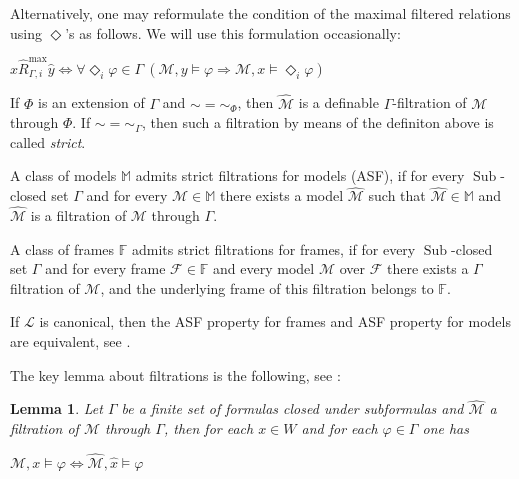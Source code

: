 \documentclass[a4paper]{article}
\theoremstyle{defin}
\theoremstyle{theorem}
\theoremstyle{prop}
\theoremstyle{lemma}
\newtheorem{lemma}{Lemma}
\theoremstyle{fact}
\theoremstyle{ex}
\theoremstyle{col}
\theoremstyle{claim}
\begin{document}
Alternatively, one may reformulate the condition of the maximal filtered relations using $\Diamond$'s as follows. We will use this formulation occasionally:

\begin{center}
  $\hat{x} \widehat{R}_{\Gamma,i}^{\text{max}} \hat{y} \Leftrightarrow \forall \Diamond_i \varphi \in \Gamma \: (\mathcal{M}, y \models \varphi \Rightarrow \mathcal{M}, x \models \Diamond_i \varphi)$
\end{center}

If $\Phi$ is an extension of $\Gamma$ and $\sim = \sim_{\Phi}$, then $\widehat{\mathcal{M}}$ is a definable $\Gamma$-filtration of $\mathcal{M}$ through $\Phi$. If $\sim = \sim_{\Gamma}$, then such a filtration by means of the definiton above is called \emph{strict}.

A class of models $\mathbb{M}$ admits strict filtrations for models (ASF), if for every $\operatorname{Sub}$-closed set $\Gamma$ and for every $\mathcal{M} \in \mathbb{M}$ there exists a model $\widehat{\mathcal{M}}$ such that $\widehat{\mathcal{M}} \in \mathbb{M}$ and $\widehat{\mathcal{M}}$ is a filtration of $\mathcal{M}$ through $\Gamma$.

A class of frames $\mathbb{F}$ admits strict filtrations for frames, if for every $\operatorname{Sub}$-closed set $\Gamma$ and for every frame $\mathcal{F} \in \mathbb{F}$ and every model $\mathcal{M}$ over $\mathcal{F}$ there exists a $\Gamma$ filtration of $\mathcal{M}$, and the underlying frame of this filtration belongs to $\mathbb{F}$.

If $\mathcal{L}$ is canonical, then the ASF property for frames and ASF property for models are equivalent, see \cite[Theorem 2.10]{kikot2020completeness}.

The key lemma about filtrations is the following, see \cite[Theorem 2.39]{blackburn_rijke_venema_2001}:

\begin{lemma}
  Let $\Gamma$ be a finite set of formulas closed under subformulas and $\widehat{\mathcal{M}}$ a filtration of $\mathcal{M}$ through $\Gamma$, then for each $x \in W$ and for each $\varphi \in \Gamma$ one has
  \begin{center}
    $\mathcal{M}, x \models \varphi \Leftrightarrow \widehat{\mathcal{M}}, \hat{x} \models \varphi$
  \end{center}
\end{lemma}
\end{document}
